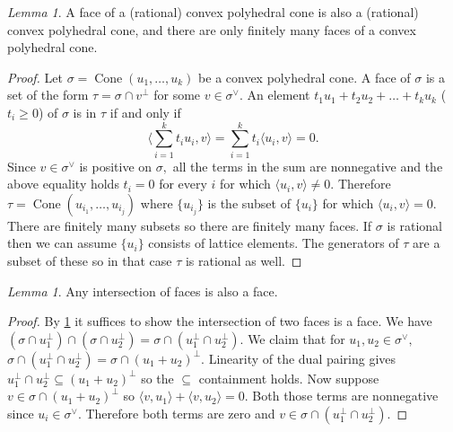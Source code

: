 \documentclass[BSc]{usydthesis}
\numberwithin{equation}{chapter}
\theoremstyle{remark}
\newtheorem{Lemma}[equation]{Lemma}
\newcommand{\V}{\vee}
\DeclareMathOperator{\Cone}{Cone}
\begin{document}
\begin{Lemma}\label{D} A face of a (rational) convex polyhedral cone is also a (rational) convex polyhedral cone, and there are only finitely many faces of a convex polyhedral cone.
\end{Lemma}

\begin{proof} Let $\sigma = \Cone(u_1,\ldots, u_k)$ be a convex polyhedral cone. A face of $\sigma$ is a set of the form $\tau = \sigma \cap v^{\perp}$ for some $v\in \sigma^{\V}.$ An element $t_1 u_1 + t_2 u_2 + \ldots + t_k u_k$ ($t_i \geq 0$) of $\sigma$ is in $\tau$ if and only if $$\bigg\langle \sum_{i=1}^k t_i u_i, v \bigg\rangle= \sum_{i=1}^k t_i \langle u_i, v \rangle =0.$$ Since $v\in \sigma^{\V}$ is positive on $\sigma,$ all the terms in the sum are nonnegative and the above equality holds $t_i=0$ for every $i$ for which $\langle u_i, v \rangle \neq 0.$ Therefore $\tau = \Cone (u_{i_1}, \ldots, u_{i_j} )$ where $\{ u_{i_j} \}$ is the subset of $\{ u_i \}$ for which $\langle u_i, v \rangle =0.$ There are finitely many subsets so there are finitely many faces. If $\sigma$ is rational then we can assume $\{ u_i \}$ consists of lattice elements. The generators of $\tau$ are a subset of these so in that case $\tau$ is rational as well.
\end{proof}

\begin{Lemma} Any intersection of faces is also a face.
\end{Lemma}
\begin{proof} By \ref{D} it suffices to show the intersection of two faces is a face. We have $(\sigma \cap u_1^{\perp} ) \cap (\sigma \cap u_2^{\perp} ) = \sigma \cap (u_1^{\perp} \cap u_2^{\perp} ).$ We claim that for $u_1, u_2\in \sigma^{\V},$ $\sigma \cap (u_1^{\perp} \cap u_2^{\perp} )= \sigma \cap (u_1 + u_2)^{\perp}.$ Linearity of the dual pairing gives $u_1^{\perp} \cap u_2^{\perp} \subseteq (u_1+u_2)^{\perp}$ so the $\subseteq$ containment holds. Now suppose $v\in \sigma \cap (u_1 + u_2)^{\perp}$ so $\langle v, u_1 \rangle + \langle v, u_2 \rangle =0.$ Both those terms are nonnegative since $u_i \in \sigma^{\V}.$ Therefore both terms are zero and $v\in \sigma \cap (u_1^{\perp} \cap u_2^{\perp} ).$
\end{proof}
\end{document}
